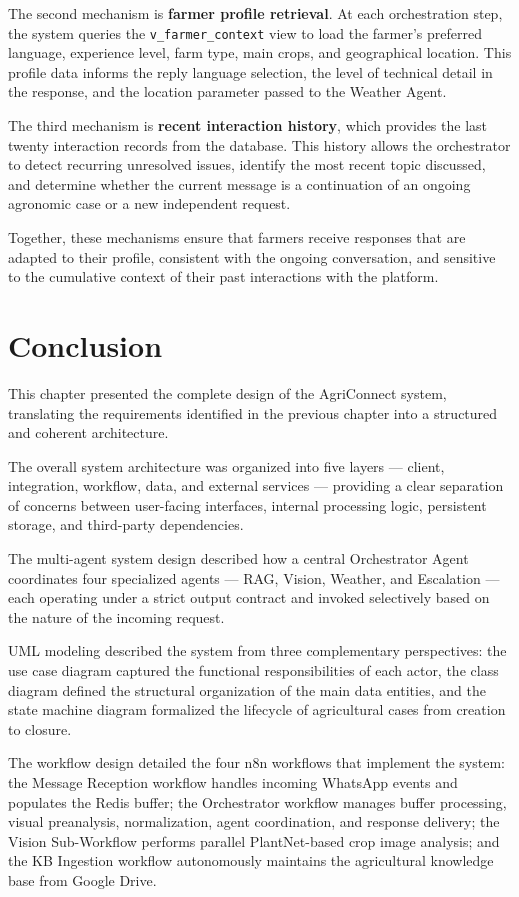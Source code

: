 The second mechanism is \textbf{farmer profile retrieval}. At each orchestration step, the system queries the \texttt{v\_farmer\_context} view to load the farmer’s preferred language, experience level, farm type, main crops, and geographical location. This profile data informs the reply language selection, the level of technical detail in the response, and the location parameter passed to the Weather Agent.

The third mechanism is \textbf{recent interaction history}, which provides the last twenty interaction records from the database. This history allows the orchestrator to detect recurring unresolved issues, identify the most recent topic discussed, and determine whether the current message is a continuation of an ongoing agronomic case or a new independent request.

Together, these mechanisms ensure that farmers receive responses that are adapted to their profile, consistent with the ongoing conversation, and sensitive to the cumulative context of their past interactions with the platform.

\section{Conclusion}

This chapter presented the complete design of the AgriConnect system, translating the requirements identified in the previous chapter into a structured and coherent architecture.

The overall system architecture was organized into five layers — client, integration, workflow, data, and external services — providing a clear separation of concerns between user-facing interfaces, internal processing logic, persistent storage, and third-party dependencies.

The multi-agent system design described how a central Orchestrator Agent coordinates four specialized agents — RAG, Vision, Weather, and Escalation — each operating under a strict output contract and invoked selectively based on the nature of the incoming request.

UML modeling described the system from three complementary perspectives: the use case diagram captured the functional responsibilities of each actor, the class diagram defined the structural organization of the main data entities, and the state machine diagram formalized the lifecycle of agricultural cases from creation to closure.

The workflow design detailed the four n8n workflows that implement the system: the Message Reception workflow handles incoming WhatsApp events and populates the Redis buffer; the Orchestrator workflow manages buffer processing, visual preanalysis, normalization, agent coordination, and response delivery; the Vision Sub-Workflow performs parallel PlantNet-based crop image analysis; and the KB Ingestion workflow autonomously maintains the agricultural knowledge base from Google Drive.

